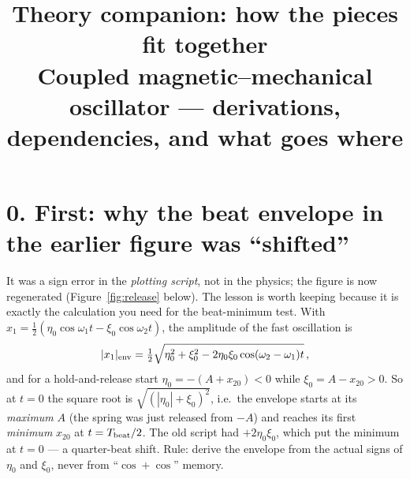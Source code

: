 \documentclass[11pt,a4paper]{article}
\title{\vspace{-1.5em}Theory companion: how the pieces fit together\\[2pt]\large Coupled magnetic--mechanical oscillator --- derivations, dependencies, and what goes where}
\author{}\date{}
\begin{document}
\maketitle\vspace{-2.5em}

\section*{0. First: why the beat envelope in the earlier figure was ``shifted''}
It was a sign error in the \emph{plotting script}, not in the physics; the figure is now regenerated (Figure~\ref{fig:release} below). The lesson is worth keeping because it is exactly the calculation you need for the beat-minimum test. With $x_1=\tfrac12(\eta_0\cos\omega_1t-\xi_0\cos\omega_2t)$, the amplitude of the fast oscillation is
\[
|x_1|_{\rm env}=\tfrac12\sqrt{\eta_0^2+\xi_0^2-2\eta_0\xi_0\cos(\omega_2-\omega_1)t}\,,
\]
and for a hold-and-release start $\eta_0=-(A+x_{20})<0$ while $\xi_0=A-x_{20}>0$. So at $t=0$ the square root is $\sqrt{(|\eta_0|+\xi_0)^2}$, i.e.\ the envelope starts at its \emph{maximum} $A$ (the spring was just released from $-A$) and reaches its first \emph{minimum} $x_{20}$ at $t=T_{\rm beat}/2$. The old script had $+2\eta_0\xi_0$, which put the minimum at $t=0$ --- a quarter-beat shift. Rule: derive the envelope from the actual signs of $\eta_0$ and $\xi_0$, never from ``$\cos+\cos$'' memory.
\end{document}
